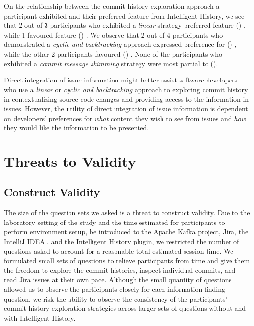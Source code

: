 On the relationship between the commit history exploration approach 
a participant exhibited and their preferred feature from Intelligent History,
we see that 2 out of 3 participants who exhibited a \textit{linear} strategy preferred feature () ,
while 1 favoured feature () .
We observe that 2 out of 4 participants who demonstrated a \textit{cyclic and backtracking} 
approach expressed preference for () ,
while the other 2 participants favoured () .
None of the participants who exhibited a \textit{commit message skimming} strategy 
were most partial to ().

\pagebreak
\begin{summary}[RQ3]
  Direct integration of issue information might better assist software developers 
  who use a \textit{linear} or \textit{cyclic and backtracking} approach to exploring commit history 
  in contextualizing source code changes and providing access to the information in  issues.
  However, the utility of direct integration of issue information is dependent on developers' preferences 
  for \emph{what} content they wish to see from issues and \emph{how} they would like 
  the information to be presented.
\end{summary}


\section{Threats to Validity}

\subsection{Construct Validity}

The size of the question sets we asked is a threat to construct validity.
Due to the laboratory setting of the study and the time estimated for participants to perform environment setup,
 be introduced to the Apache Kafka project, Jira, the IntelliJ IDEA , and the Intelligent History plugin,
we restricted the number of questions asked to account for a reasonable total estimated session time.
We formulated small sets of questions to relieve participants from time  
and give them the freedom to explore the commit histories, inspect individual commits, and read Jira issues at their own pace.
Although the small quantity of questions allowed us to observe the participants closely for each information-finding question,
we risk the ability to observe the consistency of the participants' commit history exploration strategies
across larger sets of questions without and with Intelligent History.

